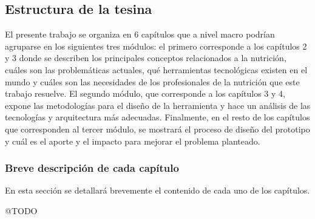 \subsection{Estructura de la tesina}
\label{estructura}

El presente trabajo se organiza en 6 capítulos que a nivel macro podrían agruparse en los siguientes tres módulos: el primero corresponde a los capítulos 2 y 3 donde se describen los principales conceptos relacionados a la nutrición, cuáles son las problemáticas actuales, qué herramientas tecnológicas existen en el mundo y cuáles son las necesidades de los profesionales de la nutrición que este trabajo resuelve. El segundo módulo, que corresponde a los capítulos 3 y 4, expone las metodologías para el diseño de la herramienta y hace un análisis de las tecnologías y arquitectura más adecuadas. Finalmente, en el resto de los capítulos que corresponden al tercer módulo, se mostrará el proceso de diseño del prototipo y cuál es el aporte y el impacto para mejorar el problema planteado.



\subsubsection{Breve descripción de cada capítulo}

En esta sección se detallará brevemente el contenido de cada uno de los capítulos.

@TODO

